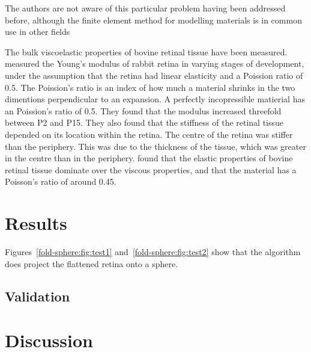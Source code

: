 \documentclass{article}
\begin{document}
 The authors are not aware of this particular problem
having been addressed before, although the  finite element method for
modelling materials is in common use in other fields 

The bulk viscoelastic properties of bovine retinal tissue have been
measured.  \citet{ReicEtal91deve} measured the Young's modulus of
rabbit retina in varying stages of development, under the assumption
that the retina had linear elasticity and a Poission ratio of 0.5.
The Poission's ratio is an index of how much a material shrinks in the
two dimentions perpendicular to an expansion. A perfectly
incopressible matierial has an Poission's ratio of 0.5. They found
that the modulus increased threefold between P2 and P15. They also
found that the stiffness of the retinal tissue depended on its
location within the retina. The centre of the retina was stiffer than
the periphery. This was due to the thickness of the tissue, which was
greater in the centre than in the periphery.  \citet{LuEtal06visc}
found that the elastic properties of bovine retinal tissue dominate
over the viscous properties, and that the material has a Poisson's
ratio of around 0.45.


\section{Results}
\label{fold-sphere:sec:results}

Figures~\ref{fold-sphere:fig:test1} and~\ref{fold-sphere:fig:test2}
show that the algorithm does project the flattened retina onto a
sphere.

\subsection{Validation}
\label{fold-sphere:sec:validation}



\section{Discussion}
\label{fold-sphere:sec:discussion}
\end{document}
